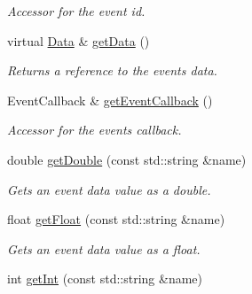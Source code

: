 \begin{DoxyCompactItemize}
\begin{DoxyCompactList}\small\item\em Accessor for the event id. \end{DoxyCompactList}\item 
\mbox{\label{class_arcana_1_1_event_a156db327591193d9f949a2079bbc27be}} 
virtual \mbox{\hyperlink{class_arcana_1_1_event_1_1_data}{Data}} \& \mbox{\hyperlink{class_arcana_1_1_event_a156db327591193d9f949a2079bbc27be}{get\+Data}} ()
\begin{DoxyCompactList}\small\item\em Returns a reference to the event\textquotesingle{}s data. \end{DoxyCompactList}\item 
\mbox{\label{class_arcana_1_1_event_aa29eb75e212830a21e0d5956032de557}} 
Event\+Callback \& \mbox{\hyperlink{class_arcana_1_1_event_aa29eb75e212830a21e0d5956032de557}{get\+Event\+Callback}} ()
\begin{DoxyCompactList}\small\item\em Accessor for the event\textquotesingle{}s callback. \end{DoxyCompactList}\item 
\mbox{\label{class_arcana_1_1_event_a4523da5756dcad3a12ad6877f346280d}} 
double \mbox{\hyperlink{class_arcana_1_1_event_a4523da5756dcad3a12ad6877f346280d}{get\+Double}} (const std\+::string \&name)
\begin{DoxyCompactList}\small\item\em Gets an event data value as a double. \end{DoxyCompactList}\item 
\mbox{\label{class_arcana_1_1_event_a5cda5e337cd3d1b934b876e89b6a16ef}} 
float \mbox{\hyperlink{class_arcana_1_1_event_a5cda5e337cd3d1b934b876e89b6a16ef}{get\+Float}} (const std\+::string \&name)
\begin{DoxyCompactList}\small\item\em Gets an event data value as a float. \end{DoxyCompactList}\item 
\mbox{\label{class_arcana_1_1_event_a219085d17da44b6b1eec7d989acac482}} 
int \mbox{\hyperlink{class_arcana_1_1_event_a219085d17da44b6b1eec7d989acac482}{get\+Int}} (const std\+::string \&name)

\end{DoxyCompactItemize}

